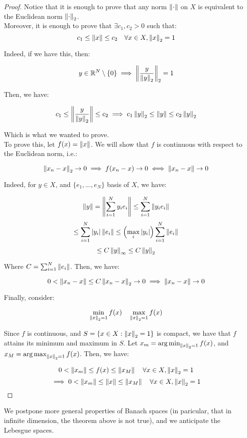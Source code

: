 \begin{proof}
    Notice that it is enough to prove that any norm $\left\|\cdot\right\|$ on $X$ is equivalent to the
    Euclidean norm $\left\|\cdot\right\|_2$.\\

    Moreover, it is enough to prove that $\exists c_1, c_2 > 0$ such that:
    $$c_1 \leq \left\|x\right\| \leq c_2  \quad \forall x \in X, \left\|x\right\|_2 = 1$$

    Indeed, if we have this, then:

    $$y \in \mathbb{R}^N \setminus \{0\} \implies \left\|\frac{y}{\left\|y\right\|_2}\right\|_2 = 1$$

    Then, we have:

    $$c_1 \leq \left\|\frac{y}{\left\|y\right\|_2}\right\| \leq c_2 \implies c_1 \left\|y\right\|_2 \leq \left\|y\right\| \leq c_2 \left\|y\right\|_2$$

    Which is what we wanted to prove.\\

    To prove this, let $f(x) = \left\|x\right\|$. We will show that $f$ is 
    continuous with respect to the Euclidean norm, i.e.:

    $$\left\|x_n - x\right\|_2 \to 0 \implies f(x_n - x) \to 0 \iff \left\|x_n - x\right\| \to 0$$

    Indeed, for $y \in X$, and $\{e_1, ..., e_N\}$ basis of $X$, we have:

    $$\left\|y\right\| = \left\|\sum_{i=1}^N y_i e_i\right\| \leq \sum_{i=1}^N \left\|y_i e_i\right\|$$
    $$\leq \sum_{i=1}^N |y_i| \left\|e_i\right\| \leq \left( \max_{i} |y_i| \right) \sum_{i=1}^N \left\|e_i\right\|$$
    $$\leq C \left\|y\right\|_\infty \leq C \left\|y\right\|_2$$

    Where $C = \sum_{i=1}^N \left\|e_i\right\|$. Then, we have:

    $$0 < \left\|x_n - x\right\| \leq C \left\|x_n - x\right\|_2 \to 0 \implies \left\|x_n - x\right\| \to 0$$

    Finally, consider:

    $$\min_{\left\|x\right\|_2 = 1} f(x) \quad \max_{\left\|x\right\|_2 = 1} f(x)$$

    Since $f$ is continuous, and $S = \{x \in X: \left\|x\right\|_2 = 1\}$ is compact, we have that
    $f$ attains its minimum and maximum in $S$. Let $x_m = \operatorname*{arg\,min}_{\left\|x\right\|_2 = 1} f(x)$, and
    $x_M = \operatorname*{arg\,max}_{\left\|x\right\|_2 = 1} f(x)$. Then, we have:

    $$0 < \left\|x_m\right\| \leq f(x) \leq \left\|x_M\right\| \quad \forall x \in X, \left\|x\right\|_2 = 1$$
    $$\implies 0 < \left\|x_m\right\| \leq \left\|x\right\| \leq \left\|x_M\right\| \quad \forall x \in X, \left\|x\right\|_2 = 1$$

\end{proof}

\begin{fnote}
    We postpone more general properties of Banach spaces (in paricular, 
    that in infinite dimension, the theorem above is not true), and 
    we anticipate the Lebesgue spaces.
\end{fnote}

